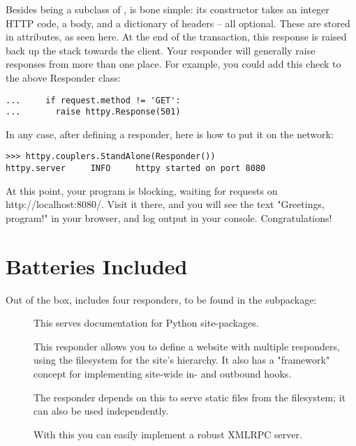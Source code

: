 Besides being a subclass of ,  is
bone simple: its constructor takes an integer HTTP code, a body, and a
dictionary of headers -- all optional. These are stored in attributes, as seen
here. At the end of the transaction, this response is raised back up the stack
towards the client. Your responder will generally raise responses from more than
one place. For example, you could add this check to the above Responder class:

\begin{verbatim}
...     if request.method != 'GET':
...       raise httpy.Response(501)
\end{verbatim}

In any case, after defining a responder, here is how to put it on the network:

\begin{verbatim}
>>> httpy.couplers.StandAlone(Responder())
httpy.server     INFO     httpy started on port 8080
\end{verbatim}

At this point, your program is blocking, waiting for requests on
http://localhost:8080/. Visit it there, and you will see the text "Greetings,
program!" in your browser, and log output in your console. Congratulations!


\section{Batteries Included}

Out of the box,  includes four responders, to be found in the
 subpackage:

\begin{description}

\item[]
    {This serves documentation for Python site-packages.}

\item[]
    {This responder allows you to define a website with multiple responders,
    using the filesystem for the site's hierarchy. It also has a "framework"
    concept for implementing site-wide in- and outbound hooks.}

\item[]
    {The  responder depends on this to serve static files from
    the filesystem; it can also be used independently.}

\item[]
    {With this you can easily implement a robust XMLRPC server.}

\end{description}

